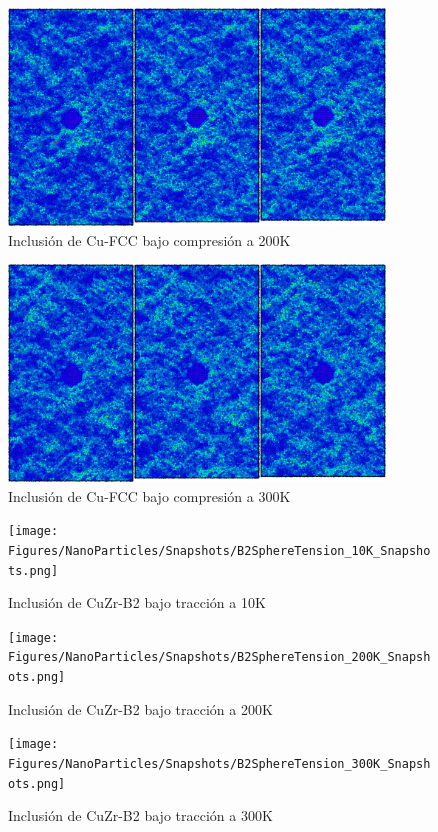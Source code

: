 \documentclass[10pt, oneside]{article} %
\begin{document}
\begin{figure}[H]
\centering
\includegraphics[width=10cm]{Figures/NanoParticles/Snapshots/cuSphereCompression_200K_Snapshots.png}
\caption{Inclusión de Cu-FCC bajo compresión a 200K}
\end{figure}

\begin{figure}[H]
\centering
\includegraphics[width=10cm]{Figures/NanoParticles/Snapshots/cuSphereCompression_300K_Snapshots.png}
\caption{Inclusión de Cu-FCC bajo compresión a 300K}
\end{figure}

\begin{figure}[H]
\centering
\texttt{[image: Figures/NanoParticles/Snapshots/B2SphereTension\_10K\_Snapshots.png]}
\caption{Inclusión de CuZr-B2 bajo tracción a 10K}
\end{figure}

\begin{figure}[H]
\centering
\texttt{[image: Figures/NanoParticles/Snapshots/B2SphereTension\_200K\_Snapshots.png]}
\caption{Inclusión de CuZr-B2 bajo tracción a 200K}
\end{figure}

\begin{figure}[H]
\centering
\texttt{[image: Figures/NanoParticles/Snapshots/B2SphereTension\_300K\_Snapshots.png]}
\caption{Inclusión de CuZr-B2 bajo tracción a 300K}
\end{figure}
\end{document}
